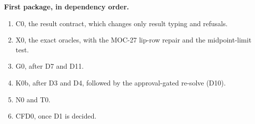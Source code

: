 

\textbf{First package, in dependency order.}
\begin{enumerate}
\item C0, the result contract, which changes only result typing and refusals.
\item X0, the exact oracles, with the MOC-27 lip-row repair and the midpoint-limit test.
\item G0, after D7 and D11.
\item K0b, after D3 and D4, followed by the approval-gated re-solve (D10).
\item N0 and T0.
\item CFD0, once D1 is decided.
\end{enumerate}
